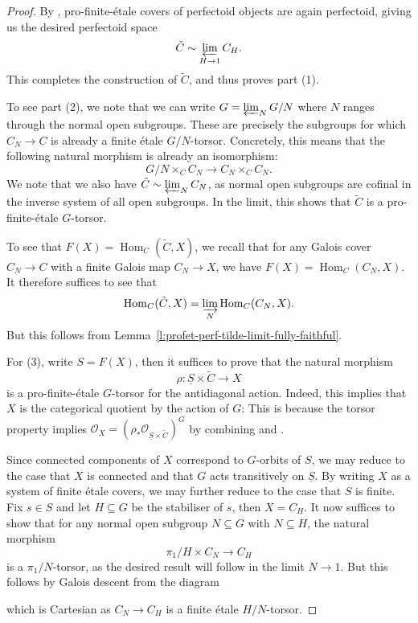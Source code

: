 \documentclass[10pt,oneside]{amsart}
\theoremstyle{definition}
\newcommand{\Hom}{\operatorname{Hom}}
\renewcommand{\O}{\mathcal{O}}
\begin{document}
\begin{proof}
By \cite[Lemma 4.6]{p-adic_Hodge}, pro-finite-\'etale covers of perfectoid objects are again perfectoid, giving us the desired perfectoid space 
\[ \tilde{C}\sim\varprojlim_{H\rightarrow 1} C_H.\]
This completes the construction of $\tilde{C}$, and thus proves part (1).

To see part (2), we note that we can write $G=\varprojlim_N G/N$ where $N$ ranges through the normal open subgroups. These are precisely the subgroups for which $C_N\to C$ is already a finite \'etale $G/N$-torsor. Concretely, this means that the following natural morphism is already an isomorphism:
\[G/N\times_C C_N\to C_N\times_CC_N.\]
We note that we also have $\tilde{C} \sim \varprojlim_NC_N$, as normal open subgroups are cofinal in the inverse system of all open subgroups. In the limit, this shows that $\tilde{C}$ is a pro-finite-\'etale $G$-torsor.

To see that $F(X)=\Hom_C(\tilde{C},X)$, we recall that for any Galois cover $C_N\to C$ with a finite Galois map $C_N\to X$, we have $F(X)=\Hom_C(C_N,X)$. It therefore suffices to see that
\[\Hom_C(\tilde{C},X)=\varinjlim_{N}\Hom_C(C_N,X).\]
But this follows from Lemma~\ref{l:profet-perf-tilde-limit-fully-faithful}.

For (3), write $S=F(X)$, then it suffices to prove that the natural morphism \[\rho:\underline{S}\times\tilde{C}\to X\]
is a pro-finite-\'etale $G$-torsor for the antidiagonal action. Indeed, this implies that $X$ is the categorical quotient by the action of $G$: This is because the torsor property implies $\O_X = (\rho_{\ast}\O_{\underline{S}\times\tilde{C}})^{G}$ by combining \cite[{Lemma~2.24}]{CHJ} and \cite[{Theorem~8.2.3}]{KedlayaLiu-II}.

 Since connected components of $X$ correspond to $G$-orbits of $S$, we may reduce to the case that $X$ is connected and that $G$ acts transitively on $\underline{S}$. By writing $X$ as a system of finite \'etale covers, we may further reduce to the case that $S$ is finite.  Fix $s\in S$ and let $H\subseteq G$ be the stabiliser of $s$, then $X=C_H$. It now suffices to show that for any normal open subgroup $N\subseteq G$ with $N\subseteq H$, the natural morphism
\[\pi_1/H\times C_N\to C_H\]
is a $\pi_1/N$-torsor, as the desired result will follow in the limit $N\to 1$. But this follows by Galois descent from the diagram
\begin{center}
\end{center}
which is Cartesian as $C_N\to C_H$ is a finite \'etale $H/N$-torsor.
\end{proof}
\end{document}
